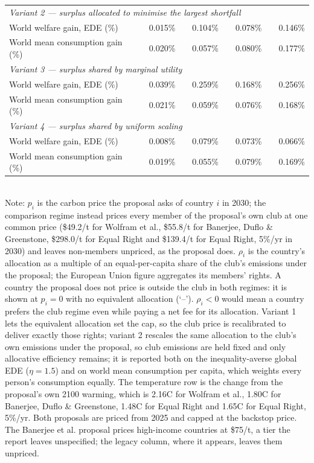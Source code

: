 \begin{table}[htbp]
\begin{tabular}{lcccccccc}
  \midrule
  \multicolumn{9}{l}{\textit{Variant 2 --- surplus allocated to minimise the largest shortfall}} \\
  \quad World welfare gain, EDE (\%) &  & 0.015\% &  & 0.104\% &  & 0.078\% &  & 0.146\% \\
  \quad World mean consumption gain (\%) &  & 0.020\% &  & 0.057\% &  & 0.080\% &  & 0.177\% \\
  \midrule
  \multicolumn{9}{l}{\textit{Variant 3 --- surplus shared by marginal utility}} \\
  \quad World welfare gain, EDE (\%) &  & 0.039\% &  & 0.259\% &  & 0.168\% &  & 0.256\% \\
  \quad World mean consumption gain (\%) &  & 0.021\% &  & 0.059\% &  & 0.076\% &  & 0.168\% \\
  \midrule
  \multicolumn{9}{l}{\textit{Variant 4 --- surplus shared by uniform scaling}} \\
  \quad World welfare gain, EDE (\%) &  & 0.008\% &  & 0.079\% &  & 0.073\% &  & 0.066\% \\
  \quad World mean consumption gain (\%) &  & 0.019\% &  & 0.055\% &  & 0.079\% &  & 0.169\% \\
  \bottomrule
\end{tabular}
\label{tab:equiv_rights_B}
\\[4pt]
{\footnotesize Note: $p_i$ is the carbon price the proposal asks of country $i$ in 2030; the comparison regime instead prices every member of the proposal's own club at one common price (\$49.2/t for Wolfram et al., \$55.8/t for Banerjee, Duflo \& Greenstone, \$298.0/t for Equal Right and \$139.4/t for Equal Right, 5\%/yr in 2030) and leaves non-members unpriced, as the proposal does. $\rho_i$ is the country's allocation as a multiple of an equal-per-capita share of the club's emissions under the proposal; the European Union figure aggregates its members' rights. A country the proposal does not price is outside the club in both regimes: it is shown at $p_i=0$ with no equivalent allocation (`--'). $\rho_i < 0$ would mean a country prefers the club regime even while paying a net fee for its allocation. Variant 1 lets the equivalent allocation set the cap, so the club price is recalibrated to deliver exactly those rights; variant 2 rescales the same allocation to the club's own emissions under the proposal, so club emissions are held fixed and only allocative efficiency remains; it is reported both on the inequality-averse global EDE ($\eta=1.5$) and on world mean consumption per capita, which weights every person's consumption equally. The temperature row is the change from the proposal's own 2100 warming, which is 2.16\textdegree{}C for Wolfram et al., 1.80\textdegree{}C for Banerjee, Duflo \& Greenstone, 1.48\textdegree{}C for Equal Right and 1.65\textdegree{}C for Equal Right, 5\%/yr. Both proposals are priced from 2025 and capped at the backstop price. The Banerjee et al. proposal prices high-income countries at \$75/t, a tier the report leaves unspecified; the legacy column, where it appears, leaves them unpriced.}
\end{table}

